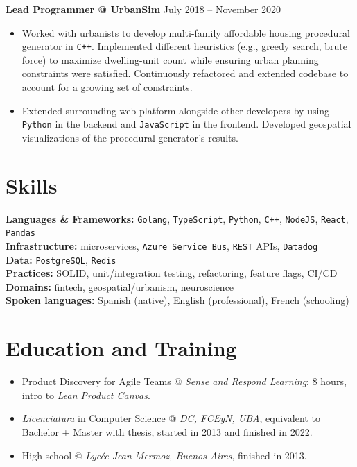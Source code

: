 \documentclass[a4paper]{article}
\begin{document}
\textbf{Lead Programmer @ UrbanSim} \hfill July 2018 -- November 2020
\begin{itemize}
  \item Worked with urbanists to develop multi-family affordable housing
    procedural generator in \texttt{C++}. Implemented different heuristics (e.g., greedy
    search, brute force) to maximize dwelling-unit count while ensuring urban
    planning constraints were satisfied. Continuously refactored and extended
    codebase to account for a growing set of constraints.
  \item Extended surrounding web platform alongside other developers by using
    \texttt{Python} in the backend and \texttt{JavaScript} in the frontend.
    Developed geospatial visualizations of the procedural generator's results.
\end{itemize}

\section*{Skills}

\textbf{Languages \& Frameworks:} \texttt{Golang}, \texttt{TypeScript},
\texttt{Python}, \texttt{C++}, \texttt{NodeJS}, \texttt{React}, \texttt{Pandas}
\\

\textbf{Infrastructure:} microservices, \texttt{Azure Service Bus},
\texttt{REST} APIs, \texttt{Datadog} \\

\textbf{Data:} \texttt{PostgreSQL}, \texttt{Redis} \\

\textbf{Practices:} SOLID, unit/integration testing, refactoring, feature flags,
CI/CD \\

\textbf{Domains:} fintech, geospatial/urbanism, neuroscience \\

\textbf{Spoken languages:} Spanish (native), English (professional), French
(schooling)

\section*{Education and Training}

\begin{itemize}
  \item Product Discovery for Agile Teams @ \textit{Sense and Respond Learning}; 8 hours, intro to \textit{Lean Product Canvas}.
  \item \textit{Licenciatura} in Computer Science @ \textit{DC, FCEyN, UBA}, equivalent to Bachelor + Master with thesis, started in 2013 and finished in 2022.
  \item High school @ \textit{Lyc\'{e}e Jean Mermoz, Buenos Aires}, finished in 2013.
\end{itemize}
\end{document}
